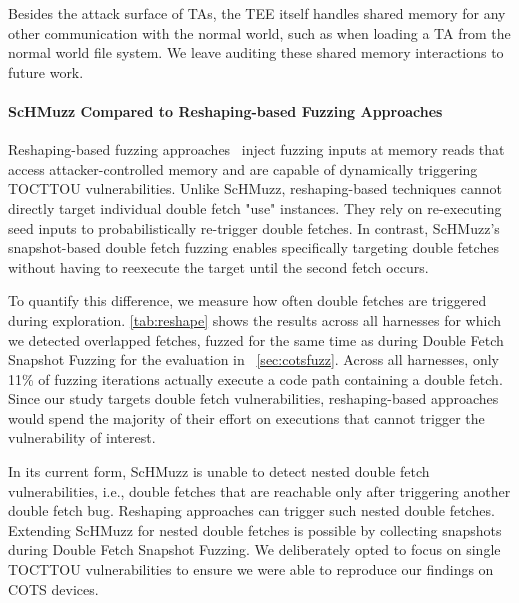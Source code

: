 \documentclass[letterpaper,twocolumn,10pt]{article}
\newcommand{\sysname}{ScHMuzz\xspace}
\newcommand{\stagetwo}{Double Fetch Snapshot Fuzzing\xspace}
\newcommand{\numexecsdfperc}{11\%\xspace}
\begin{document}
Besides the attack surface of TAs, the TEE 
itself handles shared memory for any other communication with the normal world, 
such as when loading a TA from the normal world file system. We leave auditing 
these shared memory interactions to future work.

\paragraph{\sysname Compared to Reshaping-based Fuzzing Approaches}

Reshaping-based fuzzing approaches~\cite{morphuzz, chen2024enclavefuzz} 
inject fuzzing inputs at memory reads that access 
attacker-controlled memory and are capable of dynamically triggering TOCTTOU vulnerabilities. 
Unlike \sysname, reshaping-based techniques cannot directly target individual double fetch "use" 
instances. They rely on re-executing seed inputs to probabilistically 
re-trigger double fetches. In contrast, \sysname's snapshot-based double fetch fuzzing 
enables specifically targeting double fetches without having to reexecute the target until 
the second fetch occurs. 

To quantify this difference, we measure 
how often double fetches are triggered during exploration. \autoref{tab:reshape} shows the results 
across all harnesses for which we detected overlapped fetches, fuzzed for the same time as during 
\stagetwo for the evaluation in ~\autoref{sec:cotsfuzz}. Across all harnesses, only 
\numexecsdfperc{} of fuzzing iterations actually execute a code path containing a double 
fetch. Since our study targets double fetch vulnerabilities, reshaping-based 
approaches would spend the majority of their effort on executions that cannot trigger the 
vulnerability of interest. 

In its current form, \sysname is unable to detect nested double fetch vulnerabilities, i.e., double fetches 
that are reachable only after triggering another double fetch bug. Reshaping approaches 
can trigger such nested double fetches. Extending \sysname for nested double fetches is possible 
by collecting snapshots during \stagetwo. We deliberately opted to focus on single TOCTTOU 
vulnerabilities to ensure we were able to reproduce our findings on COTS devices. 
\end{document}
